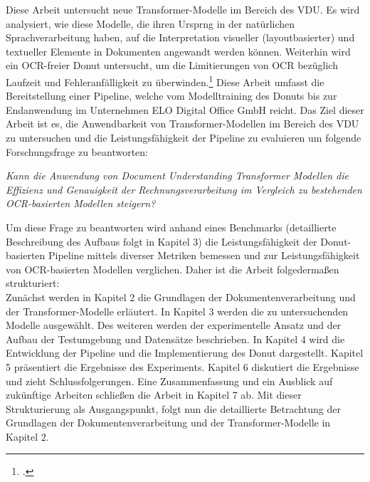 Diese Arbeit untersucht neue Transformer-Modelle im Bereich des VDU. Es wird analysiert, wie diese Modelle, die ihren Ursprng in der natürlichen Sprachverarbeitung haben, auf die Interpretation visueller (layoutbasierter) und textueller Elemente in Dokumenten angewandt werden können. Weiterhin wird ein OCR-freier \ac{Donut} untersucht, um die Limitierungen von OCR bezüglich Laufzeit und Fehleranfälligkeit zu überwinden.\footcites[Vgl.][S.1]{kim_ocr-free_2021} Diese Arbeit umfasst die Bereitstellung einer Pipeline, welche vom Modelltraining des Donuts bis zur Endanwendung im Unternehmen ELO Digital Office GmbH reicht. 
Das Ziel dieser Arbeit ist es, die Anwendbarkeit von Transformer-Modellen im Bereich des \ac{VDU} zu untersuchen und die Leistungsfähigkeit der Pipeline zu evaluieren um folgende Forschungsfrage zu beantworten:
\begin{center}
    \emph{Kann die Anwendung von Document Understanding Transformer Modellen die Effizienz und Genauigkeit der Rechnungsverarbeitung im Vergleich zu bestehenden OCR-basierten Modellen steigern?}
\end{center} 
Um diese Frage zu beantworten wird anhand eines Benchmarks (detaillierte Beschreibung des Aufbaus folgt in Kapitel 3) die Leistungsfähigkeit der Donut-basierten Pipeline mittels diverser Metriken bemessen und zur Leistungsfähigkeit von OCR-basierten Modellen verglichen. Daher ist die Arbeit folgedermaßen strukturiert: \\Zunächst werden in Kapitel 2 die Grundlagen der Dokumentenverarbeitung und der Transformer-Modelle erläutert. In Kapitel 3 werden die zu untersuchenden Modelle ausgewählt. Des weiteren werden der experimentelle Ansatz und der Aufbau der Testumgebung und Datensätze beschrieben. In Kapitel 4 wird die Entwicklung der Pipeline und die Implementierung des Donut dargestellt. Kapitel 5 präsentiert die Ergebnisse des Experiments. Kapitel 6 diskutiert die Ergebnisse und zieht Schlussfolgerungen. Eine Zusammenfassung und ein Ausblick auf zukünftige Arbeiten schließen die Arbeit in Kapitel 7 ab. Mit dieser Strukturierung als Ausgangspunkt, folgt nun die detaillierte Betrachtung der Grundlagen der Dokumentenverarbeitung und der Transformer-Modelle in Kapitel 2.
